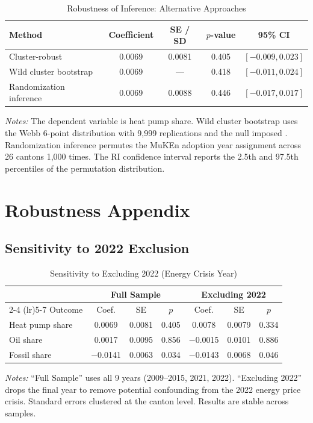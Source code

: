 \documentclass[12pt]{article}
\begin{document}
\begin{table}[H]
\centering
\caption{Robustness of Inference: Alternative Approaches}
\label{tab:robustness_inference}
\begin{tabular}{lcccc}
\toprule
Method & Coefficient & SE / SD & $p$-value & 95\% CI \\
\midrule
Cluster-robust & 0.0069 & 0.0081 & 0.405 & $[-0.009, 0.023]$ \\
Wild cluster bootstrap & 0.0069 & --- & 0.418 & $[-0.011, 0.024]$ \\
Randomization inference & 0.0069 & 0.0088 & 0.446 & $[-0.017, 0.017]$ \\
\bottomrule
\end{tabular}
\begin{minipage}{0.85\textwidth}
\vspace{6pt}
\footnotesize
\textit{Notes:} The dependent variable is heat pump share. Wild cluster bootstrap uses the Webb 6-point distribution with 9,999 replications and the null imposed \citep{cameron2008bootstrap, fischer2021wild}. Randomization inference permutes the MuKEn adoption year assignment across 26 cantons 1,000 times. The RI confidence interval reports the 2.5th and 97.5th percentiles of the permutation distribution.
\end{minipage}
\end{table}


\section{Robustness Appendix}

\subsection{Sensitivity to 2022 Exclusion}

\begin{table}[H]
\centering
\caption{Sensitivity to Excluding 2022 (Energy Crisis Year)}
\label{tab:excl2022}
\begin{tabular}{lcccccc}
\toprule
& \multicolumn{3}{c}{Full Sample} & \multicolumn{3}{c}{Excluding 2022} \\
\cmidrule(lr){2-4} \cmidrule(lr){5-7}
Outcome & Coef. & SE & $p$ & Coef. & SE & $p$ \\
\midrule
Heat pump share & 0.0069 & 0.0081 & 0.405 & 0.0078 & 0.0079 & 0.334 \\
Oil share & 0.0017 & 0.0095 & 0.856 & $-$0.0015 & 0.0101 & 0.886 \\
Fossil share & $-$0.0141 & 0.0063 & 0.034 & $-$0.0143 & 0.0068 & 0.046 \\
\bottomrule
\end{tabular}
\begin{minipage}{0.85\textwidth}
\vspace{6pt}
\footnotesize
\textit{Notes:} ``Full Sample'' uses all 9 years (2009--2015, 2021, 2022). ``Excluding 2022'' drops the final year to remove potential confounding from the 2022 energy price crisis. Standard errors clustered at the canton level. Results are stable across samples.
\end{minipage}
\end{table}
\end{document}
